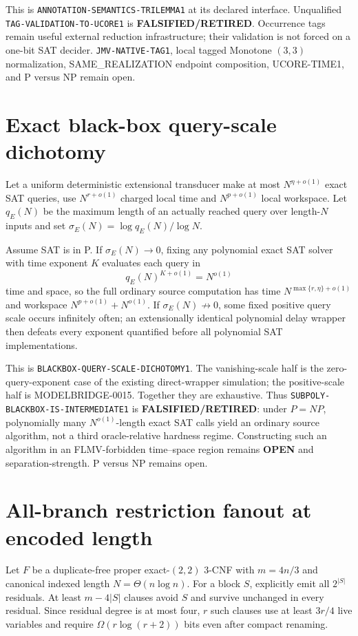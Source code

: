 \documentclass[11pt]{article}
\begin{document}
This is \texttt{ANNOTATION-SEMANTICS-TRILEMMA1} at its declared interface.
Unqualified \texttt{TAG-VALIDATION-TO-UCORE1} is
\textbf{FALSIFIED/RETIRED}.  Occurrence tags remain useful external reduction
infrastructure; their validation is not forced on a one-bit SAT decider.
\texttt{JMV-NATIVE-TAG1}, local tagged Monotone \((3,3)\) normalization,
SAME\_REALIZATION endpoint composition, UCORE-TIME1, and P versus NP remain
open.

\section{Exact black-box query-scale dichotomy}
Let a uniform deterministic extensional transducer make at most
\(N^{\eta+o(1)}\) exact SAT queries, use \(N^{r+o(1)}\) charged local
time and \(N^{p+o(1)}\) local workspace.  Let \(q_E(N)\) be the maximum
length of an actually reached query over length-\(N\) inputs and set
\(\sigma_E(N)=\log q_E(N)/\log N\).

Assume SAT is in P.  If \(\sigma_E(N)\to0\), fixing any polynomial exact
SAT solver with time exponent \(K\) evaluates each query in
\[
  q_E(N)^{K+o(1)}=N^{o(1)}
\]
time and space, so the full ordinary source computation has time
\(N^{\max\{r,\eta\}+o(1)}\) and workspace
\(N^{p+o(1)}+N^{o(1)}\).  If \(\sigma_E(N)\not\to0\), some fixed
positive query scale occurs infinitely often; an extensionally identical
polynomial delay wrapper then defeats every exponent quantified before all
polynomial SAT implementations.

This is \texttt{BLACKBOX-QUERY-SCALE-DICHOTOMY1}.  The vanishing-scale half
is the zero-query-exponent case of the existing direct-wrapper simulation;
the positive-scale half is MODELBRIDGE-0015.  Together they are exhaustive.
Thus \texttt{SUBPOLY-BLACKBOX-IS-INTERMEDIATE1} is
\textbf{FALSIFIED/RETIRED}: under \(P=NP\), polynomially many
\(N^{o(1)}\)-length exact SAT calls yield an ordinary source algorithm, not
a third oracle-relative hardness regime.  Constructing such an algorithm in
an FLMV-forbidden time--space region remains \textbf{OPEN} and
separation-strength.  P versus NP remains open.


\section{All-branch restriction fanout at encoded length}
Let \(F\) be a duplicate-free proper exact-\((2,2)\) 3-CNF with
\(m=4n/3\) and canonical indexed length \(N=\Theta(n\log n)\). For a block
\(S\), explicitly emit all \(2^{|S|}\) residuals. At least \(m-4|S|\)
clauses avoid \(S\) and survive unchanged in every residual. Since residual
degree is at most four, \(r\) such clauses use at least \(3r/4\) live
variables and require \(\Omega(r\log(r+2))\) bits even after compact
renaming.
\end{document}

